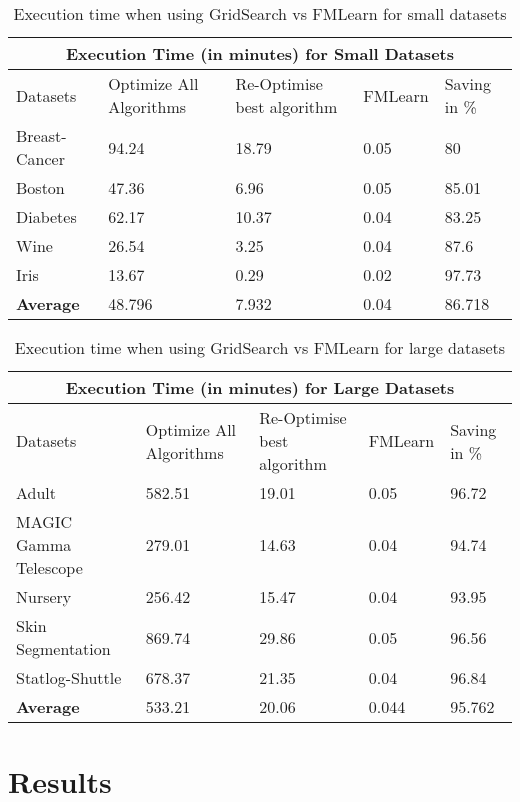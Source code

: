 \begin{table}[h!]
\centering 
\vspace*{+5pt}
 \begin{tabular}{ |p{1in}||p{1in}|p{1in}|p{0.7in}|p{0.8in}|  }
 \hline
 \multicolumn{5}{|c|}{Execution Time (in minutes) for Small Datasets} \\
 \hline
 Datasets & Optimize All Algorithms & Re-Optimise best algorithm & FMLearn & Saving in \%\\
 \hline
 Breast-Cancer & 94.24 & 18.79 & 0.05 & 80 \\
 \hline
 Boston & 47.36 & 6.96 & 0.05 & 85.01 \\
 \hline
 Diabetes & 62.17 & 10.37 & 0.04 & 83.25 \\
 \hline
 Wine & 26.54 & 3.25 &  0.04 & 87.6 \\
 \hline
 Iris & 13.67 & 0.29 & 0.02 & 97.73 \\
 \hline
 \hline
 \textbf{Average} & 48.796 & 7.932 & 0.04 & 86.718 \\
 \hline
\end{tabular}
\vspace*{+5pt}
\caption{Execution time when using GridSearch vs FMLearn for small datasets}
\label{table:1}
\end{table}
\vspace*{-10pt}

\begin{table}[h!]
\centering 
\vspace*{+5pt}
 \begin{tabular}{ |p{1.8in}||p{1in}|p{1in}|p{0.7in}|p{0.8in}|  }
 \hline
 \multicolumn{5}{|c|}{Execution Time (in minutes) for Large Datasets} \\
 \hline
 Datasets & Optimize All Algorithms & Re-Optimise best algorithm & FMLearn & Saving in \%\\
 \hline
 Adult & 582.51 & 19.01 & 0.05 & 96.72 \\
 \hline
 MAGIC Gamma Telescope & 279.01 & 14.63 & 0.04 & 94.74 \\
  \hline
 Nursery & 256.42 & 15.47 &  0.04 & 93.95 \\
 \hline
 Skin Segmentation & 869.74 & 29.86 & 0.05 & 96.56 \\
 \hline
 Statlog-Shuttle & 678.37 & 21.35 & 0.04 & 96.84 \\
 \hline
 \hline
 \textbf{Average} & 533.21 & 20.06 & 0.044 & 95.762 \\
 \hline
\end{tabular}
\vspace*{+5pt}
\caption{Execution time when using GridSearch vs FMLearn for large datasets}
\label{table:2}
\end{table}
\vspace*{-10pt}

\section{Results}